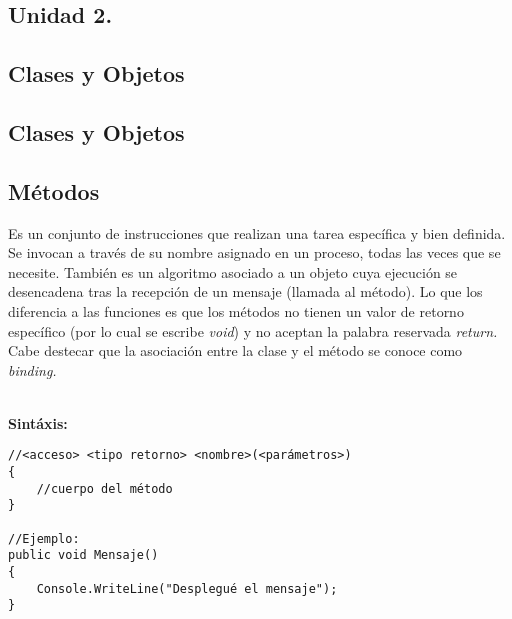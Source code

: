 \documentclass[letterpaper, 12pt]{article}
\begin{document}
    \newpage
        \justify
        \begin{huge}
            \bigbreak
            \bigbreak
            \bigbreak
            \section*{\huge{Unidad 2.}}
            \subsection*{\huge{Clases y Objetos}}
        \end{huge}

    \newpage
    \begin{justify}
        \section{Clases y Objetos}
        \subsection{Métodos}
        Es un conjunto de instrucciones que realizan una tarea específica y bien definida. Se invocan a través de su nombre asignado en un proceso,
        todas las veces que se necesite. También es un algoritmo asociado a un objeto cuya ejecución se desencadena tras la recepción de un mensaje (llamada al método).
        Lo que los diferencia a las funciones es que los métodos no tienen un valor de retorno específico (por lo cual se escribe \emph{void}) y no aceptan
        la palabra reservada \emph{return.} Cabe destecar que la asociación entre la clase y el método se conoce como \emph{binding.}
        
        \textbf{\\Sintáxis:}
            \begin{verbatim}
//<acceso> <tipo retorno> <nombre>(<parámetros>)
{
    //cuerpo del método
}

//Ejemplo:
public void Mensaje()
{
    Console.WriteLine("Desplegué el mensaje");
}
            \end{verbatim}

\end{justify}
\end{document}
